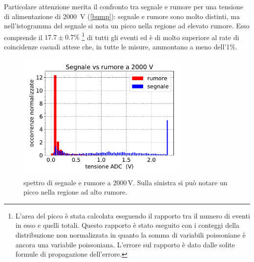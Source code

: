 Particolare attenzione merita il confronto tra segnale e rumore per una tensione di alimentazione di \SI{2000}{V} (\autoref{bump}): segnale e rumore sono molto distinti, ma nell'istogramma del segnale si nota un picco nella regione ad elevato rumore.
Esso comprende il $17.7\pm0.7\%$%
\footnote{L'area del picco è stata calcolata eseguendo il rapporto tra il numero di eventi in esso e quelli totali. Questo rapporto è stato eseguito con i conteggi della distribuzione non normalizzata in quanto la somma di variabili poissoniane è ancora una variabile poissoniana. L'errore sul rapporto è dato dalle solite formule di propagazione dell'errore.}
di tutti gli eventi ed è di molto superiore al rate di coincidenze casuali attese che, in tutte le misure, ammontano a meno dell'1\%.

\begin{figure}[h]
\centering
\includegraphics[width=23em]{2000}
\caption{spettro di segnale e rumore a 2000\,V. Sulla sinistra si può notare un picco nella regione ad alto rumore.}
\label{bump}
\end{figure}
